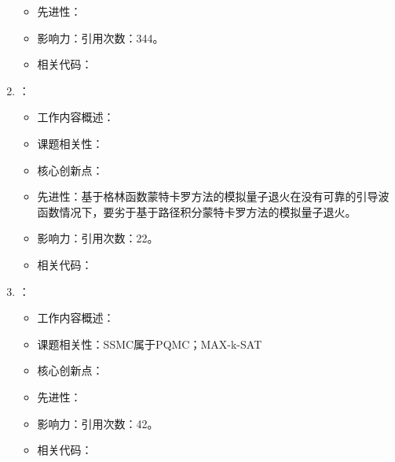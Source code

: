 \begin{enumerate}
\begin{itemize}
            \item 先进性：
            \item 影响力：引用次数：344。
            \item 相关代码：
        \end{itemize}
        \item \citet{stella2007quantum}：
            \begin{itemize}
                \item 工作内容概述：
                \item 课题相关性：
                \item 核心创新点：
                \item 先进性：基于格林函数蒙特卡罗方法的模拟量子退火在没有可靠的引导波函数情况下，要劣于基于路径积分蒙特卡罗方法的模拟量子退火。
                \item 影响力：引用次数：22。
                \item 相关代码：
            \end{itemize}
        \item \citet{jarret2016adiabatic}：
            \begin{itemize}
                \item 工作内容概述：
                \item 课题相关性：SSMC属于PQMC；MAX-k-SAT
                \item 核心创新点：
                \item 先进性：
                \item 影响力：引用次数：42。
                \item 相关代码：
            \end{itemize}
    \end{enumerate}

